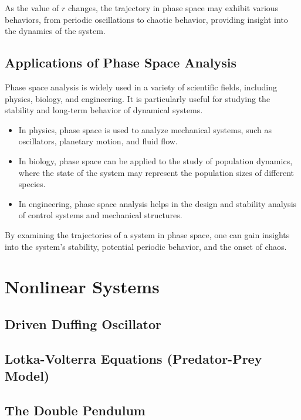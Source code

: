 \documentclass{amsbook}
\begin{document}
As the value of \( r \) changes, the trajectory in phase space may exhibit various behaviors, from periodic oscillations to chaotic behavior, providing insight into the dynamics of the system.

\subsection{Applications of Phase Space Analysis}

Phase space analysis is widely used in a variety of scientific fields, including physics, biology, and engineering. It is particularly useful for studying the stability and long-term behavior of dynamical systems. 

\begin{itemize}
    \item In physics, phase space is used to analyze mechanical systems, such as oscillators, planetary motion, and fluid flow.
    \item In biology, phase space can be applied to the study of population dynamics, where the state of the system may represent the population sizes of different species.
    \item In engineering, phase space analysis helps in the design and stability analysis of control systems and mechanical structures.
\end{itemize}

By examining the trajectories of a system in phase space, one can gain insights into the system's stability, potential periodic behavior, and the onset of chaos.


\section{Nonlinear Systems}
\subsection{Driven Duffing Oscillator}

\subsection{Lotka-Volterra Equations (Predator-Prey Model)}

\subsection{The Double Pendulum}
\end{document}
